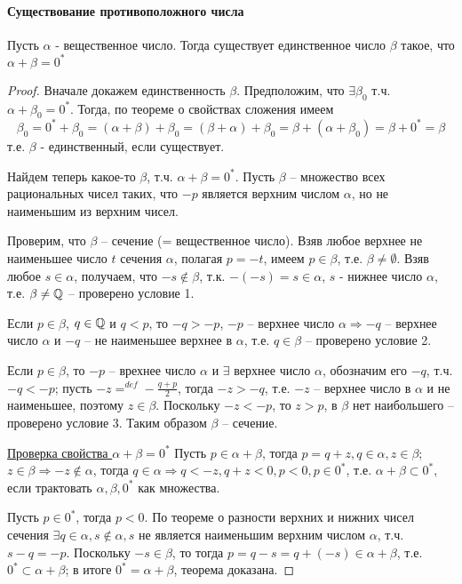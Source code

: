 \documentclass[main]{subfiles}
\begin{document}
\paragraph{Существование противоположного числа}
\begin{theorem}
    Пусть $\alpha$ - вещественное число. Тогда существует единственное число
    $\beta$ такое, что $\alpha + \beta = 0^*$
\end{theorem}
\begin{proof}
    Вначале докажем единственность $\beta$. Предположим, что $\exists \beta_0$ т.ч.
    $\alpha + \beta_0 = 0^*$. Тогда, по теореме о свойствах сложения имеем
    \[
        \beta_0 = 0^* + \beta_0 = (\alpha + \beta) + \beta_0 = (\beta + \alpha) +
        \beta_0 = \beta + (\alpha + \beta_0) = \beta + 0^* = \beta
    \]
    т.е. $\beta$ - единственный, если существует.

    Найдем теперь какое-то $\beta$, т.ч. $\alpha + \beta = 0^*$. Пусть $\beta$ --
    множество всех рациональных чисел таких, что $-p$ является верхним числом
    $\alpha$, но не наименьшим из верхним чисел.

    Проверим, что $\beta$ -- сечение (= вещественное число). Взяв любое верхнее не
    наименьшее число $t$ сечения $\alpha$, полагая $p = -t$, имеем $p \in \beta$,
    т.е. $\beta \neq \emptyset$. Взяв любое $s \in \alpha$, получаем, что
    $-s \notin \beta$, т.к. $-(-s) = s \in \alpha$, $s$ - нижнее число $\alpha$,
    т.е. $\beta \neq \mathbb{Q}$ -- проверено условие 1.

    Если $p \in \beta$, $q \in \mathbb{Q}$ и $q < p$, то $-q > -p$, $-p$ -- верхнее число
    $\alpha \Rightarrow -q$ -- верхнее число $\alpha$ и $-q$ -- не наименьшее
    верхнее в $\alpha$, т.е. $q \in \beta$ -- проверено условие 2.

    Если $p \in \beta$, то $-p$ -- врехнее число $\alpha$ и $\exists$ верхнее число
    $\alpha$, обозначим его $-q$, т.ч. $-q < -p$; пусть $-z=^{def}-\frac{q + p}{2}$,
    тогда $-z > -q$, т.е. $-z$ -- верхнее число в $\alpha$ и не наименьшее, поэтому
    $z \in \beta$. Поскольку $-z < -p$, то $z > p$, в $\beta$ нет наибольшего --
    проверено условие 3. Таким образом $\beta$ -- сечение.

    \underline{Проверка свойства $\alpha + \beta = 0^*$}
    Пусть $p \in \alpha + \beta$, тогда $p = q + z, q \in \alpha, z \in \beta$;
    $z \in \beta \Rightarrow -z \notin \alpha$, тогда $q \in \alpha \Rightarrow
        q < -z, q + z < 0, p < 0, p \in 0^*$, т.е. $\alpha + \beta \subset 0^*$,
    если трактовать $\alpha, \beta, 0^*$ как множества.

    Пусть $p \in 0^*$, тогда $p < 0$. По теореме о разности верхних и нижних
    чисел сечения $\exists q \in \alpha, s \notin \alpha, s$ не является наименьшим
    верхним числом $\alpha$, т.ч. $s - q = -p$. Поскольку $-s \in \beta$, то тогда
    $p = q - s = q + (-s) \in \alpha + \beta$, т.е. $0^* \subset \alpha + \beta$;
    в итоге $0^* = \alpha + \beta$, теорема доказана.
\end{proof}
\end{document}
